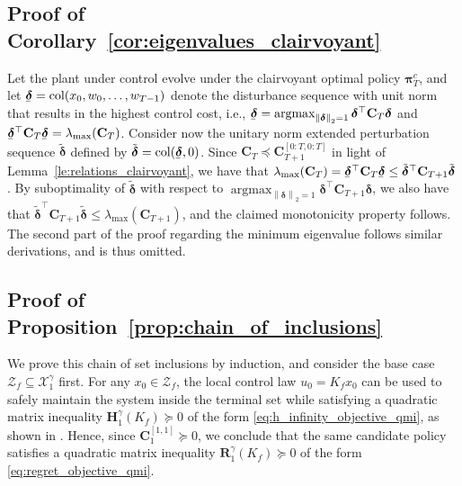 \documentclass[conference]{IEEEtran}
\newcommand{\ubar}[1]{\underaccent{\bar}{#1}}
\newcommand{\norm}[1]{\left\lVert#1\right\rVert}
\begin{document}
\subsection{Proof of Corollary~\ref{cor:eigenvalues_clairvoyant}}
\label{app:proof_eigenvalues_clairvoyant}
    Let the plant under control evolve under the clairvoyant optimal policy $\bm{\pi}^c_T$, and let $\ubar{\bm{\delta}} = \operatorname{col}(x_0, w_0, \dots, w_{T-1})$ denote the disturbance sequence with unit norm that results in the highest control cost, i.e., $\ubar{\bm{\delta}} = \operatorname{argmax}_{\norm{\bm{\delta}}_2 = 1} \bm{\delta}^\top \mathbf{C}_T \bm{\delta}$ and $\ubar{\bm{\delta}}^\top \mathbf{C}_T \ubar{\bm{\delta}} = \lambda_{\operatorname{max}}(\mathbf{C}_T)$. Consider now the unitary norm extended perturbation sequence $\tilde{\bm{\delta}}$ defined by $\tilde{\bm{\delta}} = \operatorname{col}(\ubar{\bm{\delta}}, 0)$. Since $\mathbf{C}_{T} \preceq \mathbf{C}_{T+1}^{[0:T, 0:T]}$ in light of Lemma~\ref{le:relations_clairvoyant}, we have that $\lambda_{\operatorname{max}}(\mathbf{C}_T) = \ubar{\bm{\delta}}^\top \mathbf{C}_T \ubar{\bm{\delta}} \leq \tilde{\bm{\delta}}^\top \mathbf{C}_{T+1} \tilde{\bm{\delta}}$. By suboptimality of $\tilde{\bm{\delta}}$ with respect to $\operatorname{argmax}_{\norm{\bm{\delta}}_2 = 1} \bm{\delta}^\top \mathbf{C}_{T+1} \bm{\delta}$, we also have that $\tilde{\bm{\delta}}^\top \mathbf{C}_{T+1} \tilde{\bm{\delta}} \leq \lambda_{\operatorname{max}}(\mathbf{C}_{T+1})$,
    and the claimed monotonicity property follows. The second part of the proof regarding the minimum eigenvalue follows similar derivations, and is thus omitted.

\subsection{Proof of Proposition~\ref{prop:chain_of_inclusions}}
\label{app:proof_chain_of_inclusions}
    We prove this chain of set inclusions by induction, and consider the base case $\mathcal{Z}_f \subseteq \mathcal{X}_1^\gamma$ first. For any $x_0 \in \mathcal{Z}_f$, the local control law $u_0 = K_f x_0$ can be used to safely maintain the system inside the terminal set while satisfying a quadratic matrix inequality $\mathbf{H}_1^\gamma(K_f) \succeq 0$ of the form \eqref{eq:h_infinity_objective_qmi}, as shown in \cite[Prop. 3]{goulart2009control}. Hence, since $\mathbf{C}_{1}^{[1,1]} \succeq 0$, we conclude that the same candidate policy satisfies a quadratic matrix inequality $\mathbf{R}_1^\gamma(K_f) \succeq 0$ of the form \eqref{eq:regret_objective_qmi}.
\end{document}
